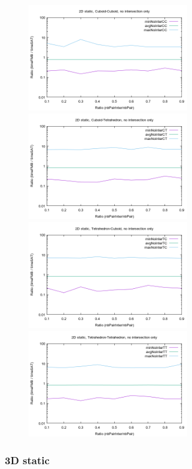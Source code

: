 \documentclass[12pt, a4paper]{article}
\begin{document}
\begin{center}
\begin{figure}[H]
\centering\includegraphics[width=7cm]{../Results/qualification2DCCnointer.png}
\centering\includegraphics[width=7cm]{../Results/qualification2DCTnointer.png}
\centering\includegraphics[width=7cm]{../Results/qualification2DTCnointer.png}
\centering\includegraphics[width=7cm]{../Results/qualification2DTTnointer.png}
\end{figure}
\end{center}

\subsubsection{3D static}
\end{document}
